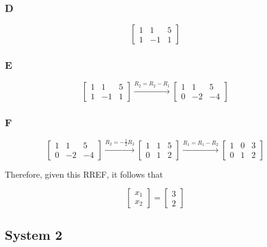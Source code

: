 \documentclass{article}
\begin{document}
\subsubsection*{D}

\[
	\begin{bmatrix}
		1 & 1  & 5 \\
		1 & -1 & 1
	\end{bmatrix}
\]

\subsubsection*{E}

\[
	\begin{bmatrix}
		1 & 1  & 5 \\
		1 & -1 & 1
	\end{bmatrix}
	\xrightarrow{R_2 = R_2 - R_1}
	\begin{bmatrix}
		1 & 1  & 5  \\
		0 & -2 & -4
	\end{bmatrix}
\]

\subsubsection*{F}

\[
	\begin{bmatrix}
		1 & 1  & 5  \\
		0 & -2 & -4
	\end{bmatrix}
	\xrightarrow{R_2 = -\frac{1}{2}R_2}
	\begin{bmatrix}
		1 & 1 & 5 \\
		0 & 1 & 2
	\end{bmatrix}
	\xrightarrow{R_1 = R_1 - R_2}
	\begin{bmatrix}
		1 & 0 & 3 \\
		0 & 1 & 2
	\end{bmatrix}
\]

Therefore, given this RREF, it follows that

\[
	\begin{bmatrix}
		x_1 \\
		x_2
	\end{bmatrix}
	=
	\begin{bmatrix}
		3 \\
		2
	\end{bmatrix}
\]

\subsection*{System 2}
\end{document}
